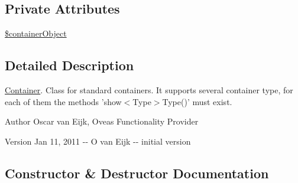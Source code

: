 \subsection*{Private Attributes}
\begin{DoxyCompactItemize}
\item 
\hyperlink{classContainer_a65102889a42244acc956c3ec6a52ffec}{\$containerObject}
\end{DoxyCompactItemize}


\subsection{Detailed Description}
\hyperlink{classContainer}{Container}. Class for standard containers. It supports several container type, for each of them the methods 'show$<$Type$>$Type()' must exist. \begin{DoxyAuthor}{Author}
Oscar van Eijk, Oveas Functionality Provider 
\end{DoxyAuthor}
\begin{DoxyVersion}{Version}
Jan 11, 2011 -\/-\/ O van Eijk -\/-\/ initial version 
\end{DoxyVersion}


\subsection{Constructor \& Destructor Documentation}
